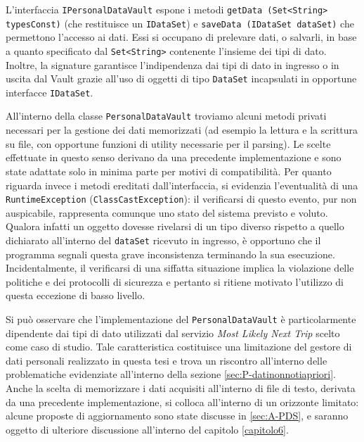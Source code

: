 L’interfaccia \texttt{IPersonalDataVault} espone i metodi \texttt{getData (Set<String> typesConst)} (che restituisce un \texttt{IDataSet}) e \texttt{saveData (IDataSet dataSet)} che permettono l’accesso ai dati. Essi si occupano di prelevare dati, o salvarli, in base a quanto specificato dal \texttt{Set<String>} contenente l’insieme dei tipi di dato. Inoltre, la signature garantisce l’indipendenza dai tipi di dato in ingresso o in uscita dal Vault grazie all’uso di oggetti di tipo \texttt{DataSet} incapsulati in opportune interfacce \texttt{IDataSet}. 

All’interno della classe \texttt{PersonalDataVault} troviamo alcuni metodi privati necessari per la gestione dei dati memorizzati (ad esempio la lettura e la scrittura su file, con opportune funzioni di utility necessarie per il parsing). Le scelte effettuate in questo senso derivano da una precedente implementazione e sono state adattate solo in minima parte per motivi di compatibilit\`a. Per quanto riguarda invece i metodi ereditati dall’interfaccia, si evidenzia l’eventualit\`a di una \texttt{RuntimeException} (\texttt{ClassCastException}): il verificarsi di questo evento, pur non auspicabile, rappresenta comunque uno stato del sistema previsto e voluto. Qualora infatti un oggetto dovesse rivelarsi di un tipo diverso rispetto a quello dichiarato all’interno del \texttt{dataSet} ricevuto in ingresso, \`e opportuno che il programma segnali questa grave inconsistenza terminando la sua esecuzione. Incidentalmente, il verificarsi di una siffatta situazione implica la violazione delle politiche e dei protocolli di sicurezza e pertanto si ritiene motivato l’utilizzo di questa eccezione di basso livello.

Si pu\`o osservare che l’implementazione del \texttt{PersonalDataVault} \`e particolarmente dipendente dai tipi di dato utilizzati dal servizio \textit{Most Likely Next Trip} scelto come caso di studio. Tale caratteristica costituisce una limitazione del gestore di dati personali realizzato in questa tesi e trova un riscontro all’interno delle problematiche evidenziate all’interno della sezione \ref{sec:P-datinonnotiapriori}. Anche la scelta di memorizzare i dati acquisiti all’interno di file di testo, derivata da una precedente implementazione, si colloca all’interno di un orizzonte limitato: alcune proposte di aggiornamento sono state discusse in \ref{sec:A-PDS}, e saranno oggetto di ulteriore discussione all’interno del capitolo \ref{capitolo6}.

